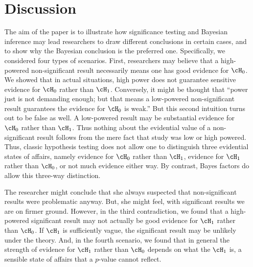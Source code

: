 \section{Discussion}
The aim of the paper is to illustrate how significance testing and Bayesian inference may lead researchers to draw different conclusions in certain cases, and to show why the Bayesian conclusion is the preferred one.  Specifically, we considered four types of scenarios. First, researchers may believe that a high-powered non-significant result necessarily means one has good evidence for $\cH_0$. We showed that in actual situations, high power does not guarantee sensitive evidence for $\cH_0$ rather than $\cH_1$.  Conversely, it might be thought that ``power just is not demanding enough; but that means a low-powered non-significant result guarantees the evidence for $\cH_0$ is weak.'' But this second intuition turns out to be false as well. A low-powered result may be substantial evidence for $\cH_0$ rather than $\cH_1$. Thus nothing about the evidential value of a non-significant result follows from the mere fact that study was low or high powered. Thus, classic hypothesis testing does not allow one to distinguish three evidential states of affairs, namely evidence for $\cH_0$ rather than $\cH_1$, evidence for $\cH_1$ rather than $\cH_0$, or not much evidence either way. By contrast, Bayes factors do allow this three-way distinction.

The researcher might conclude that she always suspected that non-significant results were problematic anyway. But, she might feel, with significant results we are on firmer ground. However, in the third contradiction, we found that a high-powered significant result may not actually be good evidence for $\cH_1$ rather than $\cH_0$. If $\cH_1$ is sufficiently vague, the significant result may be unlikely under the theory. And, in the fourth scenario, we found that in general the strength of evidence for $\cH_1$ rather than $\cH_0$ depends on what the $\cH_1$ is, a sensible state of affairs that a $p$-value cannot reflect.

